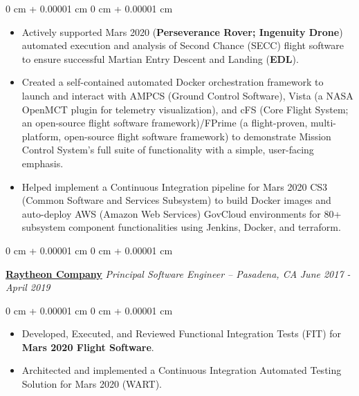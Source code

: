 \documentclass[10pt, letterpaper]{article}
\newenvironment{highlights}{
    \begin{itemize}[
        topsep=0.10 cm,
        parsep=0.10 cm,
        partopsep=0pt,
        itemsep=0pt,
        leftmargin=0 cm + 10pt
    ]
}{
    \end{itemize}
} %
\newenvironment{onecolentry}{
    \begin{adjustwidth}{
        0 cm + 0.00001 cm
    }{
        0 cm + 0.00001 cm
    }
}{
    \end{adjustwidth}
} %
\newenvironment{twocolentry}[2][]{
    \onecolentry
    \def\secondColumn{#2}
    \setcolumnwidth{\fill, 4.5 cm}
    \begin{paracol}{2}
}{
    \switchcolumn \raggedleft \secondColumn
    \end{paracol}
    \endonecolentry
} %
\begin{document}
\begin{onecolentry}
\begin{highlights}
                \item Actively supported Mars 2020 (\textbf{Perseverance Rover; Ingenuity Drone}) automated execution and analysis of Second Chance (SECC) flight software to ensure successful Martian Entry Descent and Landing (\textbf{EDL}). 

                \item Created a self-contained automated Docker orchestration framework to launch and interact with AMPCS
                (Ground Control Software), Vista (a NASA OpenMCT plugin for telemetry visualization), and cFS (Core Flight
                System; an open-source flight software framework)/FPrime (a flight-proven, multi-platform, open-source flight software framework) to demonstrate Mission Control System's full suite of
                functionality with a simple, user-facing emphasis.

                \item Helped implement a Continuous Integration pipeline for Mars 2020 CS3 (Common Software and Services
                Subsystem) to build Docker images and auto-deploy AWS (Amazon Web Services) GovCloud environments for
                80+ subsystem component functionalities using Jenkins, Docker, and terraform.
            \end{highlights}
        \end{onecolentry}


        \vspace{0.3 cm}

        \begin{twocolentry}{
            \textit{\small June 2017 - April 2019}
        }
            \href{http://www.raytheon.com/}{\textbf{\large Raytheon Company}} \textit{\small Principal Software Engineer -- Pasadena, CA}\end{twocolentry}

        \vspace{0.10 cm}
        \begin{onecolentry}
            \begin{highlights}
                \item Developed, Executed, and Reviewed Functional Integration Tests (FIT) for \textbf{Mars 2020 Flight Software}.
                \item Architected and implemented a Continuous Integration Automated Testing Solution for Mars 2020 (WART).
            \end{highlights}
        \end{onecolentry}
\end{document}
